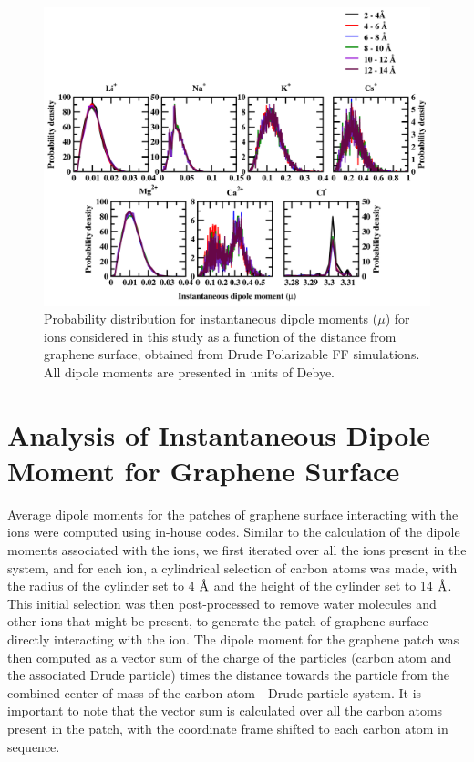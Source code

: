 \begin{figure}
    \centering
    \includegraphics[width=\textwidth]{Appendix/Figures/C1_port.png}
    \caption[Probability distribution for instantaneous dipole moments ($\mu$) for ions considered in this study as a function of the distance from graphene surface, obtained from Drude Polarizable FF simulations]{Probability distribution for instantaneous dipole moments ($\mu$) for ions considered in this study as a function of the distance from graphene surface, obtained from Drude Polarizable FF simulations. All dipole moments are presented in units of Debye.}
\end{figure}

\section{Analysis of Instantaneous Dipole Moment for Graphene Surface}
Average dipole moments for the patches of graphene surface interacting with the ions were computed using in-house codes. Similar to the calculation of the dipole moments associated with the ions, we first iterated over all the ions present in the system, and for each ion, a cylindrical selection of carbon atoms was made, with the radius of the cylinder set to 4 $\text{\normalfont\AA}$ and the height of the cylinder set to 14 $\text{\normalfont\AA}$. This initial selection was then post-processed to remove water molecules and other ions that might be present, to generate the patch of graphene surface directly interacting with the ion. The dipole moment for the graphene patch was then computed as a vector sum of the charge of the particles (carbon atom and the associated Drude particle) times the distance towards the particle from the combined center of mass of the carbon atom - Drude particle system. It is important to note that the vector sum is calculated over all the carbon atoms present in the patch, with the coordinate frame shifted to each carbon atom in sequence.

